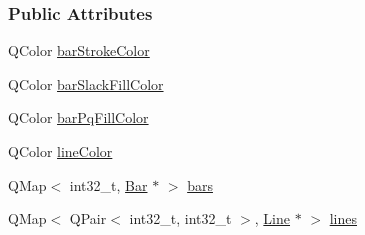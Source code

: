 \subsubsection*{Public Attributes}
\begin{DoxyCompactItemize}
\item 
Q\+Color \hyperlink{class_network_ad69052271ab0a9899948815b6201f2c6}{bar\+Stroke\+Color}
\item 
Q\+Color \hyperlink{class_network_ad78d9a206daf4ba0780067b5043c7f5c}{bar\+Slack\+Fill\+Color}
\item 
Q\+Color \hyperlink{class_network_a386f492f548ec13f5d0e350c4f2217aa}{bar\+Pq\+Fill\+Color}
\item 
Q\+Color \hyperlink{class_network_a453db7f1a994603fe4d38ac5899eb09c}{line\+Color}
\item 
Q\+Map$<$ int32\+\_\+t, \hyperlink{class_bar}{Bar} $\ast$ $>$ \hyperlink{class_network_a7fe628f7de34a96235cbd3f2cee4aff2}{bars}
\item 
Q\+Map$<$ Q\+Pair$<$ int32\+\_\+t, int32\+\_\+t $>$, \hyperlink{class_line}{Line} $\ast$ $>$ \hyperlink{class_network_acda0fd42e712e460a08a0e96511ee7eb}{lines}
\end{DoxyCompactItemize}

